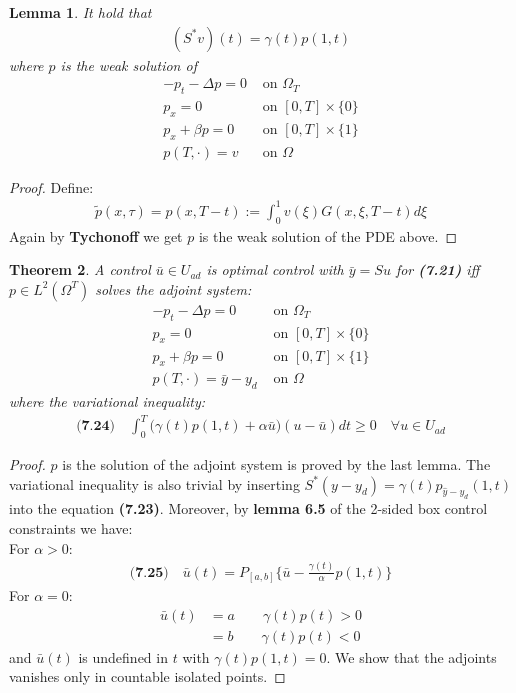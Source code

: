 \documentclass[a4paper,11pt,fleqn]{book}
\newtheorem{theorem}{Theorem}[section]
\newtheorem{lemma}[theorem]{Lemma}
\theoremstyle{definition}
\theoremstyle{remark}
\begin{document}
\begin{lemma}
	It hold that 
	\begin{align*}
		(S^*v)(t) = \gamma(t) p(1, t)
	\end{align*}
	where $p$ is the weak solution of 
	\begin{align*}
		-p_t - \Delta p = 0 &\text{ on } \Omega_T\\
		p_x = 0  &\text{ on } [0, T] \times \{0\}\\
		p_x + \beta p = 0 &\text{ on } [0, T] \times \{1\}\\
		p(T, \cdot) = v &\text{ on } \Omega
	\end{align*}
\end{lemma}
\begin{proof}
	Define:
	\begin{align*}
		\tilde{p}(x, \tau) = p(x, T - t):= \int_0^1 v(\xi) G(x, \xi, T - t) d\xi
	\end{align*}
	Again by \textbf{Tychonoff} we get $p$ is the weak solution of the PDE above. 
\end{proof}



\begin{theorem}
	A control $\bar{u} \in U_{ad}$ is optimal control with $\bar{y} = Su$ for \textbf{(7.21)} iff $p \in L^2(\Omega^T)$ solves the adjoint system:
	\begin{align*}
		-p_t - \Delta p = 0 &\text{ on } \Omega_T\\
		p_x = 0  &\text{ on } [0, T] \times \{0\}\\
		p_x + \beta p = 0 &\text{ on } [0, T] \times \{1\}\\
		p(T, \cdot) = \bar{y} - y_d  &\text{ on } \Omega
	\end{align*}
	where the variational inequality:
	\begin{align*}
	\textbf{(7.24)}\quad
		\int_0^T \bigg( \gamma(t)p(1, t) + \alpha \bar{u}\bigg)( u - \bar{u}) dt \ge 0 \quad \forall u \in U_{ad}
	\end{align*}
\end{theorem}
\begin{proof}
$p$ is the solution of the adjoint system is proved by the last lemma. The variational inequality is also trivial by inserting $S^*(y - y_d) = \gamma(t)p_{\hat{y} - y_d}(1, t)$ into the equation \textbf{(7.23)}. Moreover, by \textbf{lemma 6.5} of the 2-sided box control constraints we have:\\
For $\alpha > 0$:
\begin{align*}
	\textbf{(7.25)}\quad
	\bar{u}(t) = P_{[a, b]} \{ \bar{u}- \frac{\gamma(t)}{\alpha}p(1, t)\}
\end{align*}
For $\alpha = 0$:
\begin{align*}
	\bar{u}(t) &= a \qquad \gamma(t) p(t) > 0\\
	&= b \qquad \gamma(t)p(t) < 0
\end{align*}
and $\bar{u}(t)$ is undefined in $t$ with $\gamma(t) p(1, t) = 0$. We show that the adjoints vanishes only in countable isolated points. 
\end{proof}
\end{document}
